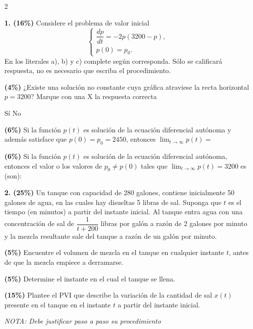 \documentclass[11pt]{article}
\begin{document}
\begin{multicols}{2}

\textbf{1. (16\%)} Considere el problema de valor inicial
\[
\begin{cases}
\dfrac{dp}{dt}=-2p(3200-p), \\
p(0)=p_0.
\end{cases}
\]
En los literales a), b) y c) complete según corresponda. Sólo se calificará respuesta, no es necesario que escriba el procedimiento.

\begin{opciones}
\item[a)] \textbf{(4\%)} ¿Existe una solución no constante cuya gráfica atraviese la recta horizontal $p=3200$? Marque con una X la respuesta correcta

Sí\underline{\hspace{1cm}} No\underline{\hspace{1cm}}

\item[b)] \textbf{(6\%)} Si la función $p(t)$ es solución de la ecuación diferencial autónoma y además satisface que $p(0)=p_0=2450$, entonces $\displaystyle\lim_{t\to\infty}p(t)=$ \underline{\hspace{2cm}}

\item[c)] \textbf{(6\%)} Si la función $p(t)$ es solución de la ecuación diferencial autónoma, entonces el valor o los valores de $p_0\neq p(0)$ tales que $\displaystyle\lim_{t\to\infty}p(t)=3200$ es (son): \underline{\hspace{3cm}}
\end{opciones}

\columnbreak

\textbf{2. (25\%)} Un tanque con capacidad de 280 galones, contiene inicialmente 50 galones de agua, en las cuales hay disueltas 5 libras de sal. Suponga que $t$ es el tiempo (en minutos) a partir del instante inicial. Al tanque entra agua con una concentración de sal de $\dfrac{1}{t+200}$ libras por galón a razón de 2 galones por minuto y la mezcla resultante sale del tanque a razón de un galón por minuto.

\begin{opciones}
\item[a.] \textbf{(5\%)} Encuentre el volumen de mezcla en el tanque en cualquier instante $t$, antes de que la mezcla empiece a derramarse.
\item[b.] \textbf{(5\%)} Determine el instante en el cual el tanque se llena.
\item[c.] \textbf{(15\%)} Plantee el PVI que describe la variación de la cantidad de sal $x(t)$ presente en el tanque en el instante $t$ a partir del instante inicial.
\end{opciones}

\textit{NOTA: Debe justificar paso a paso su procedimiento}

\vspace{4cm}

\end{multicols}
\end{document}
